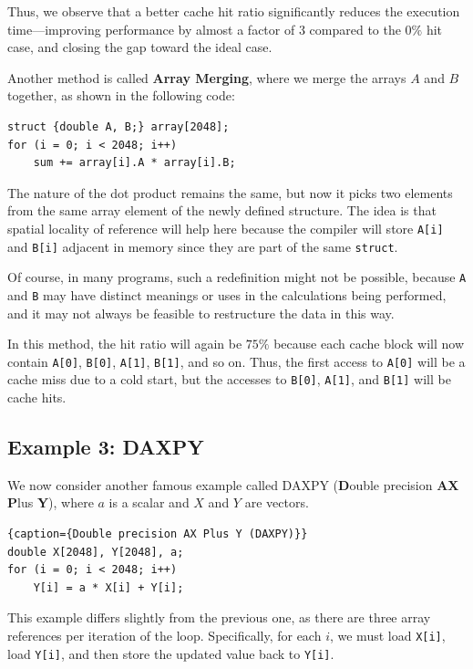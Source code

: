 \documentclass[12pt]{book}
\begin{document}
Thus, we observe that a better cache hit ratio significantly reduces the execution time—improving performance by almost a factor of $3$ compared to the $0\%$ hit case, and closing the gap toward the ideal case.


Another method is called \textbf{Array Merging}, where we merge the arrays $A$ and $B$ together, as shown in the following code:

\begin{lstlisting}
struct {double A, B;} array[2048];
for (i = 0; i < 2048; i++) 
    sum += array[i].A * array[i].B;
\end{lstlisting}

The nature of the dot product remains the same, but now it picks two elements from the same array element of the newly defined structure. The idea is that spatial locality of reference will help here because the compiler will store \texttt{A[i]} and \texttt{B[i]} adjacent in memory since they are part of the same \texttt{struct}. 

Of course, in many programs, such a redefinition might not be possible, because \texttt{A} and \texttt{B} may have distinct meanings or uses in the calculations being performed, and it may not always be feasible to restructure the data in this way.

In this method, the hit ratio will again be $75\%$ because each cache block will now contain \texttt{A[0]}, \texttt{B[0]}, \texttt{A[1]}, \texttt{B[1]}, and so on. Thus, the first access to \texttt{A[0]} will be a cache miss due to a cold start, but the accesses to \texttt{B[0]}, \texttt{A[1]}, and \texttt{B[1]} will be cache hits.

\subsection{Example 3: DAXPY}

We now consider another famous example called DAXPY (\textbf{D}ouble precision \textbf{AX} \textbf{P}lus \textbf{Y}), where $a$ is a scalar and $X$ and $Y$ are vectors.

\begin{lstlisting}{caption={Double precision AX Plus Y (DAXPY)}}
double X[2048], Y[2048], a;
for (i = 0; i < 2048; i++) 
    Y[i] = a * X[i] + Y[i];
\end{lstlisting}

This example differs slightly from the previous one, as there are three array references per iteration of the loop. Specifically, for each $i$, we must load \texttt{X[i]}, load \texttt{Y[i]}, and then store the updated value back to \texttt{Y[i]}. 
\end{document}
